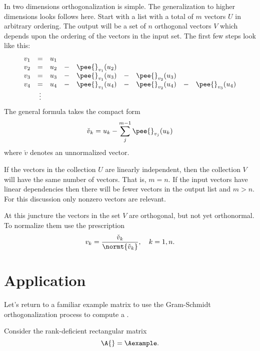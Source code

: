 In two dimensions orthogonalization is simple. The generalization to higher dimensions looks follows here. Start with a list with a total of $m$ vectors $U$ in arbitrary ordering. The output will be a set of $n$ orthogonal vectors $V$ which depends upon the ordering of the vectors in the input set. The first few steps look like this:
\begin{equation}
  \begin{array}{cccccccccc}
    v_{1} &=& u_{1}\\
    v_{2} &=& u_{2} &-& \pee{}_{v_{1}}(u_{2})\\
    v_{3} &=& u_{3} &-& \pee{}_{v_{1}}(u_{3}) &-& \pee{}_{v_{2}}(u_{3})\\
    v_{4} &=& u_{4} &-& \pee{}_{v_{1}}(u_{4}) &-& \pee{}_{v_{2}}(u_{4}) &-& \pee{}_{v_{3}}(u_{4})\\
     & \vdots
  \end{array}
\end{equation}
The general formula takes the compact form
\begin{equation}
  \check{v}_{k} = u_{k} - \sum_{j}^{m-1}{\pee{}_{v_{j}}(u_{k})}
\end{equation}
where $\check{v}$ denotes an unnormalized vector.

If the vectors in the collection $U$ are linearly independent, then the collection $V$ will have the same number of vectors. That is, $m=n$. If the input vectors have linear dependencies then there will be fewer vectors in the output list and $m>n$. For this discussion only nonzero vectors are relevant.
 
At this juncture the vectors in the set $V$ are orthogonal, but not yet orthonormal. To normalize them use the prescription
\begin{equation}
  v_{k} = \frac{\check{v}_{k}}{\normt{\check{v}_{k}}}, \quad k=1,n.
\end{equation}

\section{Application}
Let's return to a familiar example matrix to use the Gram-Schmidt orthogonalization process to compute a \svdl.

Consider the rank-deficient rectangular matrix
\begin{equation}
  \A{} = \Aexample.
\end{equation}

